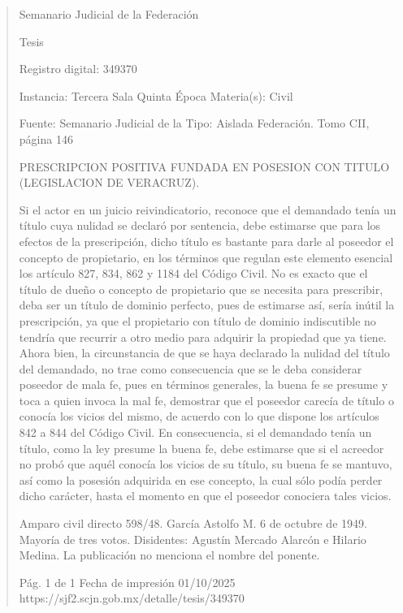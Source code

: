 \documentclass[11pt,a4paper]{article}
\begin{document}
\begin{quote}
                                                   Semanario Judicial de la Federación

                                                  Tesis

 Registro digital: 349370

 Instancia: Tercera Sala          Quinta Época                         Materia(s): Civil

                                  Fuente: Semanario Judicial de la     Tipo: Aislada
                                  Federación.
                                  Tomo CII, página 146


PRESCRIPCION POSITIVA FUNDADA EN POSESION CON TITULO (LEGISLACION DE
VERACRUZ).


Si el actor en un juicio reivindicatorio, reconoce que el demandado tenía un título cuya nulidad se
declaró por sentencia, debe estimarse que para los efectos de la prescripción, dicho título es
bastante para darle al poseedor el concepto de propietario, en los términos que regulan este
elemento esencial los artículo 827, 834, 862 y 1184 del Código Civil. No es exacto que el título de
dueño o concepto de propietario que se necesita para prescribir, deba ser un título de dominio
perfecto, pues de estimarse así, sería inútil la prescripción, ya que el propietario con título de
dominio indiscutible no tendría que recurrir a otro medio para adquirir la propiedad que ya tiene.
Ahora bien, la circunstancia de que se haya declarado la nulidad del título del demandado, no trae
como consecuencia que se le deba considerar poseedor de mala fe, pues en términos generales, la
buena fe se presume y toca a quien invoca la mal fe, demostrar que el poseedor carecía de título o
conocía los vicios del mismo, de acuerdo con lo que dispone los artículos 842 a 844 del Código
Civil. En consecuencia, si el demandado tenía un título, como la ley presume la buena fe, debe
estimarse que si el acreedor no probó que aquél conocía los vicios de su título, su buena fe se
mantuvo, así como la posesión adquirida en ese concepto, la cual sólo podía perder dicho carácter,
hasta el momento en que el poseedor conociera tales vicios.


Amparo civil directo 598/48. García Astolfo M. 6 de octubre de 1949. Mayoría de tres votos.
Disidentes: Agustín Mercado Alarcón e Hilario Medina. La publicación no menciona el nombre del
ponente.




                                             Pág. 1 de 1             Fecha de impresión 01/10/2025
  https://sjf2.scjn.gob.mx/detalle/tesis/349370

\end{quote}
\end{document}
